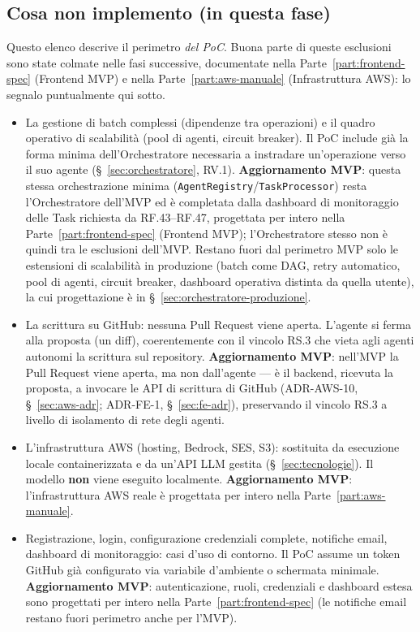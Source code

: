 \documentclass[11pt,a4paper]{article}
\begin{document}
\subsection{Cosa non implemento (in questa fase)}
Questo elenco descrive il perimetro \emph{del PoC}. Buona parte di queste esclusioni sono state colmate nelle fasi successive, documentate nella Parte~\ref{part:frontend-spec} (Frontend MVP) e nella Parte~\ref{part:aws-manuale} (Infrastruttura AWS): lo segnalo puntualmente qui sotto.
\begin{itemize}
    \item La gestione di batch complessi (dipendenze tra operazioni) e il quadro operativo di scalabilità (pool di agenti, circuit breaker). Il PoC include già la forma minima dell'Orchestratore necessaria a instradare un'operazione verso il suo agente (\S~\ref{sec:orchestratore}, RV.1). \textbf{Aggiornamento MVP}: questa stessa orchestrazione minima (\texttt{AgentRegistry}/\texttt{TaskProcessor}) resta l'Orchestratore dell'MVP ed è completata dalla dashboard di monitoraggio delle Task richiesta da RF.43--RF.47, progettata per intero nella Parte~\ref{part:frontend-spec} (Frontend MVP); l'Orchestratore stesso non è quindi tra le esclusioni dell'MVP. Restano fuori dal perimetro MVP solo le estensioni di scalabilità in produzione (batch come DAG, retry automatico, pool di agenti, circuit breaker, dashboard operativa distinta da quella utente), la cui progettazione è in \S~\ref{sec:orchestratore-produzione}.
    \item La scrittura su GitHub: nessuna Pull Request viene aperta. L'agente si ferma alla proposta (un diff), coerentemente con il vincolo RS.3 che vieta agli agenti autonomi la scrittura sul repository. \textbf{Aggiornamento MVP}: nell'MVP la Pull Request viene aperta, ma non dall'agente --- è il backend, ricevuta la proposta, a invocare le API di scrittura di GitHub (ADR-AWS-10, \S~\ref{sec:aws-adr}; ADR-FE-1, \S~\ref{sec:fe-adr}), preservando il vincolo RS.3 a livello di isolamento di rete degli agenti.
    \item L'infrastruttura AWS (hosting, Bedrock, SES, S3): sostituita da esecuzione locale containerizzata e da un'API LLM gestita (\S~\ref{sec:tecnologie}). Il modello \textbf{non} viene eseguito localmente. \textbf{Aggiornamento MVP}: l'infrastruttura AWS reale è progettata per intero nella Parte~\ref{part:aws-manuale}.
    \item Registrazione, login, configurazione credenziali complete, notifiche email, dashboard di monitoraggio: casi d'uso di contorno. Il PoC assume un token GitHub già configurato via variabile d'ambiente o schermata minimale. \textbf{Aggiornamento MVP}: autenticazione, ruoli, credenziali e dashboard estesa sono progettati per intero nella Parte~\ref{part:frontend-spec} (le notifiche email restano fuori perimetro anche per l'MVP).

\end{itemize}
\end{document}
